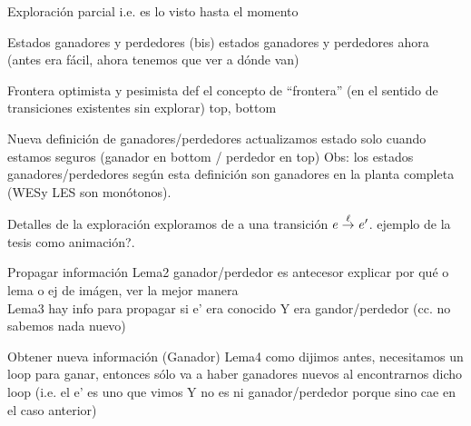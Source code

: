 

\begin{frame}{Exploración parcial}
    i.e. es lo visto hasta el momento
\end{frame}
\begin{frame}{Estados ganadores y perdedores (bis)}
    estados ganadores y perdedores ahora (antes era fácil, ahora tenemos que ver a dónde van)
\end{frame}
\begin{frame}{Frontera optimista y pesimista}
    def el concepto de ``frontera'' (en el sentido de transiciones existentes sin explorar) top, bottom
\end{frame}
\begin{frame}{Nueva definición de ganadores/perdedores}
    actualizamos estado solo cuando estamos seguros (ganador en bottom / perdedor en top)
    Obs: los estados ganadores/perdedores según esta definición son ganadores en la planta completa (WESy LES son monótonos).
\end{frame}
\begin{frame}{Detalles de la exploración}
    exploramos de a una transición $e \overset{\ell}{\rightarrow}_{} e'$. 
    ejemplo de la tesis como animación?. 
\end{frame}
\begin{frame}{Propagar información}
    Lema2 ganador/perdedor es antecesor explicar por qué o lema o ej de imágen, ver la mejor manera\\
    Lema3 hay info para propagar si e' era conocido Y era gandor/perdedor (cc. no sabemos nada nuevo)
\end{frame}
\begin{frame}{Obtener nueva información (Ganador)}
    Lema4 como dijimos antes, necesitamos un loop para ganar, entonces sólo va a haber ganadores nuevos al encontrarnos dicho loop (i.e. el e' es uno que vimos Y no es ni ganador/perdedor porque sino cae en el caso anterior)
\end{frame}
